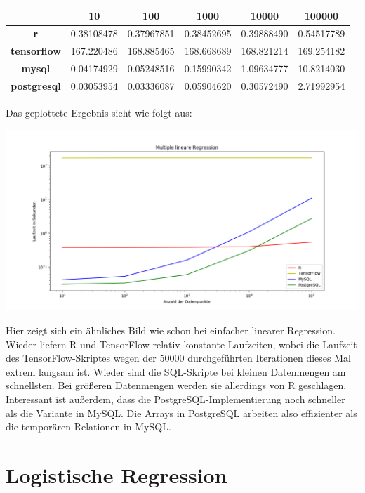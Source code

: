 \begin{center}
  \begin{tabular}{|c|c|c|c|c|c|}\hline
    & \textbf{10} & \textbf{100} & \textbf{1000} & \textbf{10000} & \textbf{100000} \\ \hline
    \textbf{r} & 0.38108478 & 0.37967851 & 0.38452695 & 0.39888490 & 0.54517789 \\ \hline
    \textbf{tensorflow} & 167.220486 & 168.885465 & 168.668689 & 168.821214 & 169.254182 \\ \hline
    \textbf{mysql} & 0.04174929 & 0.05248516 & 0.15990342 & 1.09634777 & 10.8214030 \\ \hline
    \textbf{postgresql} & 0.03053954 & 0.03336087 & 0.05904620 & 0.30572490 & 2.71992954 \\ \hline
  \end{tabular}
\end{center}

Das geplottete Ergebnis sieht wie folgt aus:

\includegraphics[width=\textwidth]{multipleLinearRegressionBenchmark}

Hier zeigt sich ein ähnliches Bild wie schon bei einfacher linearer Regression. Wieder liefern R und TensorFlow relativ konstante Laufzeiten, wobei die Laufzeit des TensorFlow-Skriptes wegen der $50000$ durchgeführten Iterationen dieses Mal extrem langsam ist. Wieder sind die SQL-Skripte bei kleinen Datenmengen am schnellsten. Bei größeren Datenmengen werden sie allerdings von R geschlagen. Interessant ist außerdem, dass die PostgreSQL-Implementierung noch schneller als die Variante in MySQL. Die Arrays in PostgreSQL arbeiten also effizienter als die temporären Relationen in MySQL.

\section{Logistische Regression}
\label{section:4:3}

